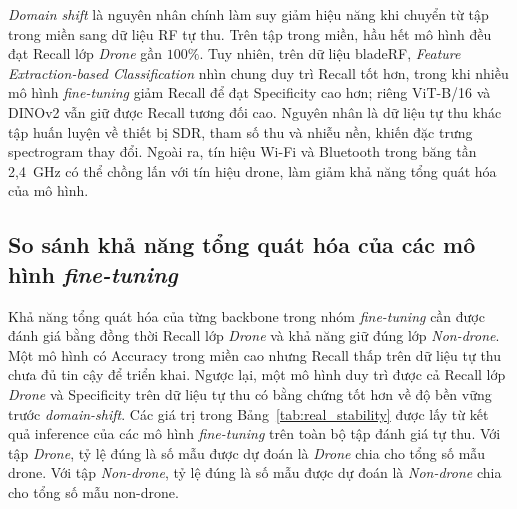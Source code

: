 \documentclass[../DoAn.tex]{subfiles}
\begin{document}
\textit{Domain shift} là nguyên nhân chính làm suy giảm hiệu năng khi chuyển từ tập trong miền sang dữ liệu RF tự thu. Trên tập trong miền, hầu hết mô hình đều đạt Recall lớp \textit{Drone} gần $100\%$. Tuy nhiên, trên dữ liệu bladeRF, \textit{Feature Extraction-based Classification} nhìn chung duy trì Recall tốt hơn, trong khi nhiều mô hình \textit{fine-tuning} giảm Recall để đạt Specificity cao hơn; riêng ViT-B/16 và DINOv2 vẫn giữ được Recall tương đối cao. Nguyên nhân là dữ liệu tự thu khác tập huấn luyện về thiết bị SDR, tham số thu và nhiễu nền, khiến đặc trưng spectrogram thay đổi. Ngoài ra, tín hiệu Wi-Fi và Bluetooth trong băng tần 2,4~GHz có thể chồng lấn với tín hiệu drone, làm giảm khả năng tổng quát hóa của mô hình.

\subsection{So sánh khả năng tổng quát hóa của các mô hình \textit{fine-tuning}}

Khả năng tổng quát hóa của từng backbone trong nhóm \textit{fine-tuning} cần được đánh giá bằng đồng thời Recall lớp \textit{Drone} và khả năng giữ đúng lớp \textit{Non-drone}. Một mô hình có Accuracy trong miền cao nhưng Recall thấp trên dữ liệu tự thu chưa đủ tin cậy để triển khai. Ngược lại, một mô hình duy trì được cả Recall lớp \textit{Drone} và Specificity trên dữ liệu tự thu có bằng chứng tốt hơn về độ bền vững trước \textit{domain-shift}. Các giá trị trong Bảng~\ref{tab:real_stability} được lấy từ kết quả inference của các mô hình \textit{fine-tuning} trên toàn bộ tập đánh giá tự thu. Với tập \textit{Drone}, tỷ lệ đúng là số mẫu được dự đoán là \textit{Drone} chia cho tổng số mẫu drone. Với tập \textit{Non-drone}, tỷ lệ đúng là số mẫu được dự đoán là \textit{Non-drone} chia cho tổng số mẫu non-drone.
\end{document}
